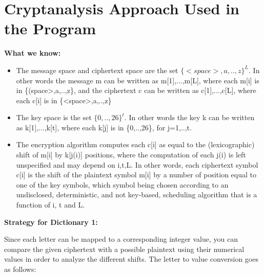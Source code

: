 \documentclass[a4paper,twoside,10pt]{report}
\begin{document}
		
	
\noindent
\section{Cryptanalysis Approach Used in the Program}\label{approach}

\noindent
\textbf{What we know: }
\begin{itemize}
	\item The message space and ciphertext space are the set $\{<space>,a,..,z\}^{L}$. In other words the message m can be written as m[1],...,m[L], where each m[i] is in \{(space>,a,..,z\}, and the ciphertext c can be written as c[1],...,c[L], where each c[i] is in \{<space>,a,..,z\}
	
	\item The key space is the set $\{0,..,26\}^{t}$. In other words the key k can be written as k[1],...,k[t], where each k[j] is in \{0,..,26\}, for j=1,..,t.
	
	\item The encryption algorithm computes each c[i] as equal to the (lexicographic) shift of m[i] by k[j(i)] positions, where the computation of each j(i) is left unspecified and may depend on i,t,L. In other words, each ciphertext symbol c[i] is the shift of the plaintext symbol m[i] by a number of position equal to one of the key symbols, which symbol being chosen according to an undisclosed, deterministic, and not key-based, scheduling algorithm that is a function of i, t and L.
	
\end{itemize}

\noindent
\textbf{Strategy for Dictionary 1: }
\vspace{3mm}

Since each letter can be mapped to a corresponding integer value, you can compare the given ciphertext with a possible plaintext using their numerical values in order to analyze the different shifts. The letter to value conversion goes as follows: 
\end{document}
